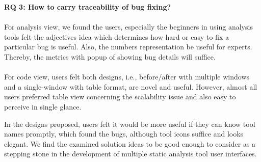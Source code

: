 \begin{myboxi}{{\textbf{RQ 3: How to carry traceability of bug fixing?}}}
\\ \\ For analysis view, we found the users, especially the beginners in using analysis tools felt the adjectives idea which determines how hard or easy to fix a particular bug is useful. Also, the numbers representation be useful for experts. Thereby, the metrics with popup of showing bug details will suffice. \\ \\

For code view, users felt both designs, i.e., before/after with multiple windows and a single-window with table format, are novel and useful. However, almost all users preferred table view concerning the scalability issue and also easy to perceive in single glance. \\
\end{myboxi}

In the designs proposed, users felt it would be more useful if they can know tool names promptly, which found the bugs, although tool icons suffice and looks elegant. We find the examined solution ideas to be good enough to consider as a stepping stone in the development of multiple static analysis tool user interfaces.

\let\cleardoublepage\clearpage
